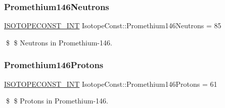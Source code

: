 \subsubsection{\texorpdfstring{Promethium146\+Neutrons}{Promethium146Neutrons}}
{\footnotesize\ttfamily \mbox{\hyperlink{group___isotope_const-_macros_ga5f18360b3e99483a35c32d789e62621c}{I\+S\+O\+T\+O\+P\+E\+C\+O\+N\+S\+T\+\_\+\+I\+NT}} Isotope\+Const\+::\+Promethium146\+Neutrons = 85}

\$ \$ Neutrons in Promethium-\/146. \mbox{\label{group___isotope_const-_promethium-_pm146_gaec84c9e831443e43ad0daf5d9473d9d7}} 
\subsubsection{\texorpdfstring{Promethium146\+Protons}{Promethium146Protons}}
{\footnotesize\ttfamily \mbox{\hyperlink{group___isotope_const-_macros_ga5f18360b3e99483a35c32d789e62621c}{I\+S\+O\+T\+O\+P\+E\+C\+O\+N\+S\+T\+\_\+\+I\+NT}} Isotope\+Const\+::\+Promethium146\+Protons = 61}

\$ \$ Protons in Promethium-\/146. 